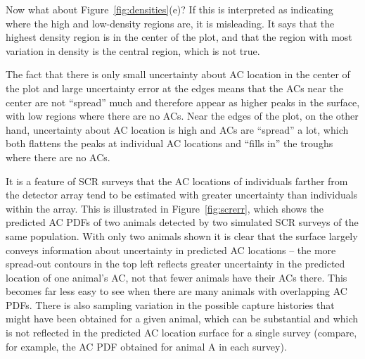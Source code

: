 \documentclass[useAMS,usenatbib,referee]{biom}
\begin{document}
Now what about Figure~\ref{fig:densities}(e)? If this is interpreted as indicating where the high and low-density regions are, it is misleading. It says that the highest density region is in the center of the plot, and that the region with most variation in density is the central region, which is not true. 

The fact that there is only small uncertainty about AC location in the center of the plot and large uncertainty error at the edges means that the ACs near the center are not ``spread'' much and therefore appear as higher peaks in the surface, with low regions where there are no ACs. Near the edges of the plot, on the other hand, uncertainty about AC location is high and ACs are ``spread'' a lot, which both flattens the peaks at individual AC locations and ``fills in'' the troughs where there are no ACs. 

It is a feature of SCR surveys that the AC locations of individuals farther from the detector array tend to be estimated with greater uncertainty than individuals within the array. This is illustrated in Figure~\ref{fig:screrr}, which shows the predicted AC PDFs of two animals detected by two simulated SCR surveys of the same population. With only two animals shown it is clear that the surface largely conveys information about uncertainty in predicted AC locations -- the more spread-out contours in the top left reflects greater uncertainty in the predicted location of one animal's AC, not that fewer animals have their ACs there. This becomes far less easy to see when there are many animals with overlapping AC PDFs. There is also sampling variation in the possible capture histories that might have been obtained for a given animal, which can be substantial and which is not reflected in the predicted AC location surface for a single survey (compare, for example, the AC PDF obtained for animal A in each survey). 

\end{document}
